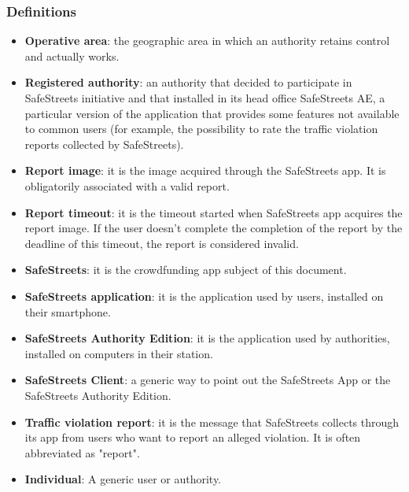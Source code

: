 \documentclass{article}
\begin{document}
		\subsubsection{Definitions}
		\begin{itemize}
			\item \textbf{Operative area}: the geographic area in which an authority retains control and actually works.
			\item \textbf{Registered authority}: an authority that decided to participate in SafeStreets initiative and that installed in its head office SafeStreets AE, a particular version of the application that provides some features not available to common users (for example, the possibility to rate the traffic violation reports collected by SafeStreets).
			\item \textbf{Report image}: it is the image acquired through the SafeStreets app. It is obligatorily associated with a valid report.
			\item \textbf{Report timeout}: it is the timeout started when SafeStreets app acquires the report image. If the user doesn't complete the completion of the report by the deadline of this timeout, the report is considered invalid.
			\item \textbf{SafeStreets}: it is the crowdfunding app subject of this document.
			\item \textbf{SafeStreets application}: it is the application used by users, installed on their smartphone.
			\item \textbf{SafeStreets Authority Edition}: it is the application used by authorities, installed on computers in their station.
			\item \textbf{SafeStreets Client}: a generic way to point out the SafeStreets App or the SafeStreets Authority Edition.
			\item \textbf{Traffic violation report}: it is the message that SafeStreets collects through its app from users who want to report an alleged violation. It is often abbreviated as "report".
			\item \textbf{Individual}: A generic user or authority.
		\end{itemize}
\end{document}
